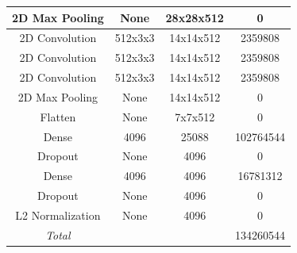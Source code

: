\documentclass[runningheads]{llncs}
\begin{document}
\begin{table}[]
{\begin{tabular}{|c|c|c|c|}
2D Max Pooling      & None           & 28x28x512            & 0                          \\ \hline
2D Convolution      & 512x3x3        & 14x14x512            & 2359808                    \\ \hline
2D Convolution      & 512x3x3        & 14x14x512            & 2359808                    \\ \hline
2D Convolution      & 512x3x3        & 14x14x512            & 2359808                    \\ \hline
2D Max Pooling      & None           & 14x14x512            & 0                          \\ \hline
Flatten             & None           & 7x7x512              & 0                          \\ \hline
Dense               & 4096           & 25088                & 102764544                  \\ \hline
Dropout             & None           & 4096                 & 0                          \\ \hline
Dense               & 4096           & 4096                 & 16781312                   \\ \hline
Dropout             & None           & 4096                 & 0                          \\ \hline
L2 Normalization    & None           & 4096                 & 0                          \\ \hline
\rowcolor[HTML]{9B9B9B} 
\textit{Total}      &                &                      & 134260544                  \\ \hline
\end{tabular}%
}
\end{table}
\end{document}

